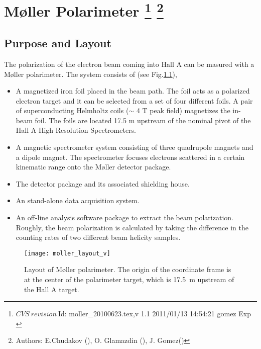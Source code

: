 \chapter[M{\o}ller Polarimeter]{M{\o}ller Polarimeter
\label{sec:moller}
\footnote{
  $CVS~revision~ $Id: moller_20100623.tex,v 1.1 2011/01/13 14:54:21 gomez Exp $ $
}
\footnote{Authors: E.Chudakov (), O. Glamazdin (), J. Gomez\hfill\break ()}
}
\section {Purpose and Layout}
\label{sec:moller_purpose}


The polarization of the electron beam coming into Hall A can be masured 
with a M{\o}ller 
polarimeter. 
The system consists of (see Fig.\ref{fig:moller_layout}),
\vspace{-\parskip}
\begin{itemize}
\item  A magnetized iron foil placed in the beam path. The foil acts as a polarized electron target and it can be selected
from a set of four different foils.
A pair of superconducting Helmholtz coils
($\sim$ 4 T peak field) magnetizes the in-beam foil. The foils are located 17.5 m upstream of the nominal pivot of the 
Hall A High Resolution Spectrometers.
\item A magnetic spectrometer system consisting of three quadrupole magnets and a dipole magnet.
The spectrometer focuses electrons scattered in a certain kinematic range
onto the M{\o}ller detector package. 
\item The detector package and its associated shielding house.
\item An stand-alone data acquisition system.
\item An off-line analysis software package to extract the beam polarization. Roughly, the beam polarization is calculated
by taking the difference in the counting rates of two different beam helicity samples.
\end{itemize}

 \begin{figure}[bht]
    \begin{center}
        \texttt{[image: moller\_layout\_v]}
    \end{center}
    \caption[M{\o}ller: layout]{
            Layout of M{\o}ller polarimeter. The origin of the 
            coordinate frame is at the center of the polarimeter
             target, which is 17.5~m upstream of the Hall A target.
            }
    \label{fig:moller_layout} 
 \end{figure}  


